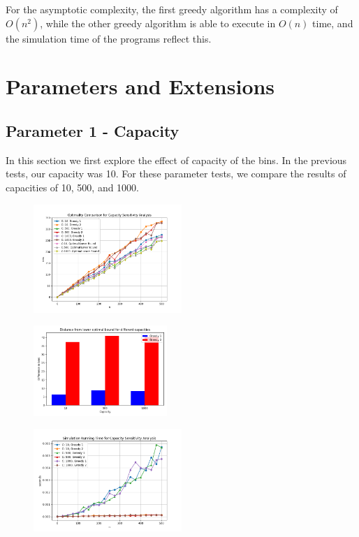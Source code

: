 \documentclass[11pt]{article}
\begin{document}
For the asymptotic complexity, the first greedy algorithm has a complexity of ${O(n^2)}$, while the
other greedy algorithm is able to execute in ${O({n})}$ time, and the simulation time of the
programs reflect this.

\section{Parameters and Extensions}
\subsection{Parameter 1 - Capacity}
In this section we first explore the effect of capacity of the bins. In the previous tests, our
capacity was 10. For these parameter tests, we compare the results of capacities of 10, 500, and
1000.
\begin{figure}[H]
	\centering
	\includegraphics[width=0.5\textwidth]{images/s1_optimality.png}
\end{figure}
\begin{figure}[H]
	\centering
	\includegraphics[width=0.45\textwidth]{images/s1_optdiff.png}
\end{figure}
\begin{figure}[H]
	\centering
	\includegraphics[width=0.5\textwidth]{images/s1_simtime.png}
\end{figure}
\end{document}
